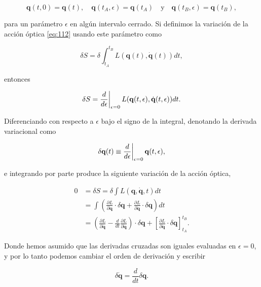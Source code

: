 \documentclass[a4paper,10pt]{article}
\numberwithin{equation}{section}
\newcommand{\zerodel}{.\kern-\nulldelimiterspace}
\begin{document}
\begin{equation}
 \mathbf{q}(t,0) = \mathbf{q}(t), \quad \mathbf{q}(t_A,\epsilon) = \mathbf{q}(t_A) 
 \quad \text{y} \quad \mathbf{q}(t_B,\epsilon) = \mathbf{q}(t_B),
\end{equation}

para un parámetro $\epsilon$ en algún intervalo cerrado. Si definimos la variación 
de la acción óptica \eqref{eq:112} usando este parámetro como 

\begin{equation}
 \delta S = \delta \int_{t_A}^{t_B} L(\mathbf{q}(t),\dot{\mathbf{q}}(t))dt,
\end{equation}

entonces

\begin{equation}
 \delta S = \left\zerodel\frac{d}{d\epsilon}\right|_{\epsilon=0} 
 L(\mathbf{q}(t,\epsilon),\dot{\mathbf{q}}(t,\epsilon))dt.
\end{equation}

Diferenciando con respecto a $\epsilon$ bajo el signo de la integral, denotando 
la derivada variacional como 

\begin{equation}
 \delta \mathbf{q}(t) \equiv  \left\zerodel\frac{d}{d\epsilon}\right|_{\epsilon=0} 
 \mathbf{q}(t,\epsilon),
\end{equation}

e integrando por parte produce la siguiente variación de la acción óptica, 

\begin{align*}
 0 &= \delta S = \delta \int L(\mathbf{q},\dot{\mathbf{q}},t)dt \\
   &= \int \left(\frac{\partial L}{\partial \mathbf{q}}\cdot \delta\mathbf{q} 
   + \frac{\partial L}{\partial \dot{\mathbf{q}}}\cdot \delta\mathbf{q} \right) dt \\
   &= \left(\frac{\partial L}{\partial \dot{\mathbf{q}}} - 
   \frac{d}{dt}\frac{\partial L}{\partial \dot{\mathbf{q}}} \right) \cdot \delta\mathbf{q}
   + \left[\frac{\partial L}{\partial \dot{\mathbf{q}}} \cdot \delta\mathbf{q}
   \right]_{t_A}^{t_B}.
\end{align*}

Donde hemos asumido que las derivadas cruzadas son iguales evaluadas en $\epsilon = 0$, 
y por lo tanto podemos cambiar el orden de derivación y escribir 

\begin{equation}
 \delta \dot{\mathbf{q}} = \frac{d}{dt}\delta\mathbf{q}.
\end{equation}
\end{document}
